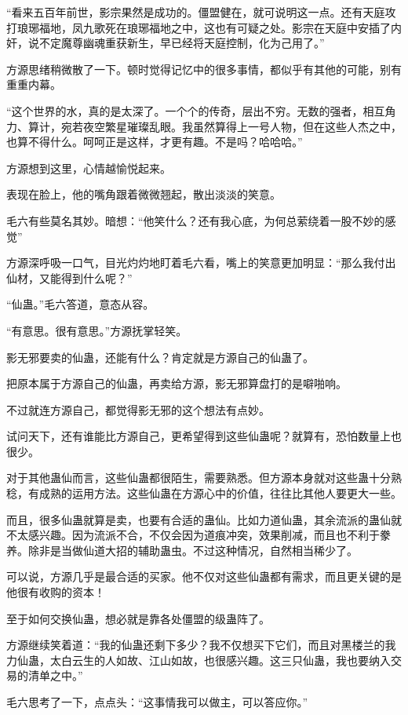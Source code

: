 \begin{this_body}
“看来五百年前世，影宗果然是成功的。僵盟健在，就可说明这一点。还有天庭攻打琅琊福地，凤九歌死在琅琊福地之中，这也有可疑之处。影宗在天庭中安插了内奸，说不定魔尊幽魂重获新生，早已经将天庭控制，化为己用了。”

方源思绪稍微散了一下。顿时觉得记忆中的很多事情，都似乎有其他的可能，别有重重内幕。

“这个世界的水，真的是太深了。一个个的传奇，层出不穷。无数的强者，相互角力、算计，宛若夜空繁星璀璨乱眼。我虽然算得上一号人物，但在这些人杰之中，也算不得什么。呵呵正是这样，才更有趣。不是吗？哈哈哈。”

方源想到这里，心情越愉悦起来。

表现在脸上，他的嘴角跟着微微翘起，散出淡淡的笑意。

毛六有些莫名其妙。暗想：“他笑什么？还有我心底，为何总萦绕着一股不妙的感觉”

方源深呼吸一口气，目光灼灼地盯着毛六看，嘴上的笑意更加明显：“那么我付出仙材，又能得到什么呢？”

“仙蛊。”毛六答道，意态从容。

“有意思。很有意思。”方源抚掌轻笑。

影无邪要卖的仙蛊，还能有什么？肯定就是方源自己的仙蛊了。

把原本属于方源自己的仙蛊，再卖给方源，影无邪算盘打的是噼啪响。

不过就连方源自己，都觉得影无邪的这个想法有点妙。

试问天下，还有谁能比方源自己，更希望得到这些仙蛊呢？就算有，恐怕数量上也很少。

对于其他蛊仙而言，这些仙蛊都很陌生，需要熟悉。但方源本身就对这些蛊十分熟稔，有成熟的运用方法。这些仙蛊在方源心中的价值，往往比其他人要更大一些。

而且，很多仙蛊就算是卖，也要有合适的蛊仙。比如力道仙蛊，其余流派的蛊仙就不太感兴趣。因为流派不合，不仅会因为道痕冲突，效果削减，而且也不利于豢养。除非是当做仙道大招的辅助蛊虫。不过这种情况，自然相当稀少了。

可以说，方源几乎是最合适的买家。他不仅对这些仙蛊都有需求，而且更关键的是他很有收购的资本！

至于如何交换仙蛊，想必就是靠各处僵盟的级蛊阵了。

方源继续笑着道：“我的仙蛊还剩下多少？我不仅想买下它们，而且对黑楼兰的我力仙蛊，太白云生的人如故、江山如故，也很感兴趣。这三只仙蛊，我也要纳入交易的清单之中。”

毛六思考了一下，点点头：“这事情我可以做主，可以答应你。”


\end{this_body}
